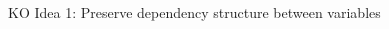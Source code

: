 \documentclass[
  ignorenonframetext,
  aspectratio=169]{beamer}
\begin{document}
\begin{frame}{KO Idea 1: Preserve dependency structure between
variables}
\protect\hypertarget{ko-idea-1-preserve-dependency-structure-between-variables}{}
\begin{columns}[T]
\begin{column}{.45\textwidth}

\scriptsize


\normalsize
\end{column}

\begin{column}{.45\textwidth}

\scriptsize

\end{column}
\end{columns}
\end{frame}
\end{document}
